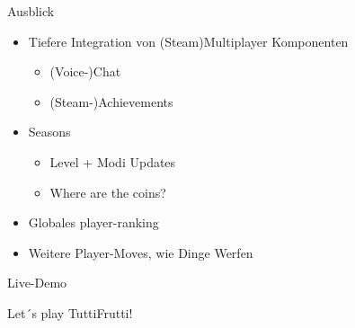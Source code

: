 \documentclass[xcolor=dvipsnames]{beamer}
\begin{document}
\begin{frame}{Ausblick}
\begin{itemize}
 		\item Tiefere Integration von (Steam)Multiplayer Komponenten
 			\begin{itemize}
 				\item (Voice-)Chat
 				\item (Steam-)Achievements
 			\end{itemize}
 		\item Seasons
 			\begin{itemize}
	 			\item Level + Modi Updates
	 			\item Where are the coins?
 			\end{itemize}
 		\item Globales player-ranking
 		\item Weitere Player-Moves, wie Dinge Werfen
\end{itemize}

\end{frame}

\begin{frame}{Live-Demo}

\begin{center}
	\Huge{\textcolor{OliveGreen}{Let´s play TuttiFrutti!}}
\end{center}

\end{frame}
\end{document}
